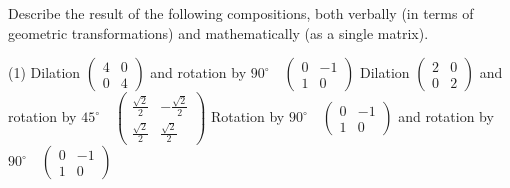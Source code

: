 \begin{enumerate}
Describe the result of the following compositions, both verbally (in terms of geometric transformations) and mathematically (as a single matrix).
\begin{tasks}[after-skip = 60pt, after-item-skip = 60pt](1)
\task Dilation $\begin{pmatrix} 4 & 0 \\ 0 & 4 \end{pmatrix}$ and rotation by $90^{\circ} \quad \begin{pmatrix} 0 & -1\\ 1& 0 \end{pmatrix}$
\task Dilation $\begin{pmatrix} 2 & 0 \\ 0 & 2 \end{pmatrix}$ and rotation by $45^{\circ} \quad \begin{pmatrix} \frac{\sqrt{2}}{2} & -\frac{\sqrt{2}}{2} \\ \frac{\sqrt{2}}{2} & \frac{\sqrt{2}}{2} \end{pmatrix}$
\task Rotation by $90^{\circ} \quad \begin{pmatrix} 0 & -1 \\ 1 & 0 \end{pmatrix}$ and rotation by $90^{\circ} \quad \begin{pmatrix} 0 & -1\\ 1& 0 \end{pmatrix}$
\end{tasks}

\end{enumerate}